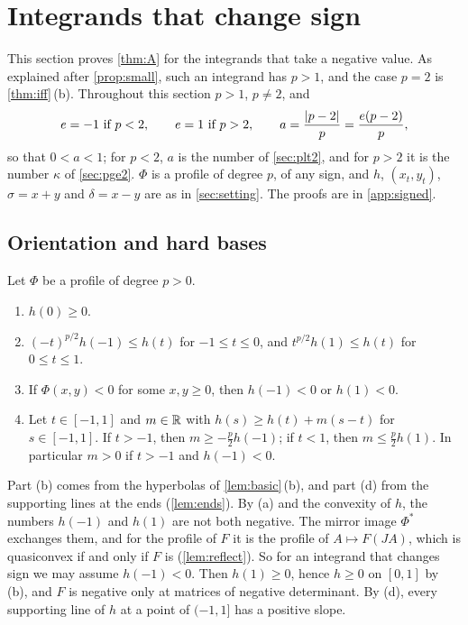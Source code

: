 \section{Integrands that change sign}\label{sec:signed}

This section proves \cref{thm:A} for the integrands that take a negative value. As explained
after \cref{prop:small}, such an integrand has $p>1$, and the case $p=2$ is \cref{thm:iff}\,(b).
Throughout this section $p>1$, $p\ne2$, and
\[
  e=-1\ \text{if }p<2,\qquad e=1\ \text{if }p>2,\qquad a=\frac{\abs{p-2}}p=\frac{e(p-2)}p,
\]
so that $0<a<1$; for $p<2$, $a$ is the number of \cref{sec:plt2}, and for $p>2$ it is the
number $\kappa$ of \cref{sec:pge2}. $\Phi$ is a profile of degree $p$, of any sign, and $h$,
$(x_t,y_t)$, $\sigma=x+y$ and $\delta=x-y$ are as in \cref{sec:setting}. The proofs are in
\cref{app:signed}.

\subsection{Orientation and hard bases}\label{sec:orientation}

\begin{lemma}\label{lem:orient}
Let $\Phi$ be a profile of degree $p>0$.
\begin{enumerate}[label=\textup{(\alph*)}]
\item $h(0)\ge0$.
\item $(-t)^{p/2}h(-1)\le h(t)$ for $-1\le t\le0$, and $t^{p/2}h(1)\le h(t)$ for $0\le t\le1$.
\item If $\Phi(x,y)<0$ for some $x,y\ge0$, then $h(-1)<0$ or $h(1)<0$.
\item Let $t\in[-1,1]$ and $m\in\mathbb{R}$ with $h(s)\ge h(t)+m(s-t)$ for $s\in[-1,1]$. If $t>-1$, then
  $m\ge-\tfrac p2h(-1)$; if $t<1$, then $m\le\tfrac p2h(1)$. In particular $m>0$ if $t>-1$ and
  $h(-1)<0$.
\end{enumerate}
\end{lemma}

Part (b) comes from the hyperbolas of \cref{lem:basic}\,(b), and part (d) from the supporting
lines at the ends (\cref{lem:ends}). By (a) and the convexity of $h$, the numbers $h(-1)$ and
$h(1)$ are not both negative. The mirror image $\Phi^\ast$ exchanges them, and for the profile
of $F$ it is the profile of $A\mapsto F(JA)$, which is quasiconvex if and only if $F$ is
(\cref{lem:reflect}). So for an integrand that changes sign we may assume $h(-1)<0$. Then
$h(1)\ge0$, hence $h\ge0$ on $[0,1]$ by (b), and $F$ is negative only at matrices of negative
determinant. By (d), every supporting line of $h$ at a point of $(-1,1]$ has a positive slope.

